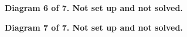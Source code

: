 \documentclass[reqno]{amsart}
\begin{document}
\newpage
\noindent
\textbf{Diagram 6 of 7. Not set up and not solved.}

































































\newpage
\noindent
\textbf{Diagram 7 of 7. Not set up and not solved.}



















\newpage
\end{document}
